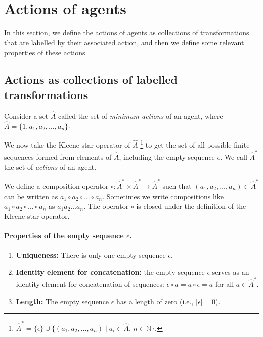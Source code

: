 \section{Actions of agents}

In this section, we define the actions of agents as collections of transformations that are labelled by their associated action, and then we define some relevant properties of these actions.

\subsection{Actions as collections of labelled transformations}

Consider a set $\hat{A}$ called the set of \emph{minimum actions} of an agent, where $\hat{A} = \{1, a_{1}, a_{2}, \dots, a_{n}\}$.

We now take the Kleene star operator of $\hat{A}$ \footnote{
	$\hat{A}^{\ast} = \{ \epsilon \} \cup \{ (a_1, a_2, \dots, a_n) \mid a_i \in \hat{A}, \, n \in \mathbb{N} \}$.
} to get the set of all possible finite sequences formed from elements of $\hat{A}$, including the empty sequence $\epsilon$.
We call $\hat{A}^{\ast}$ the set of \emph{actions} of an agent.

We define a composition operator $\circ: \hat{A}^{\ast} \times \hat{A}^{\ast} \to \hat{A}^{\ast}$ such that $(a_1, a_2, \dots, a_n) \in \hat{A}^{\ast}$ can be written as $a_1 \circ a_2 \circ \dots \circ a_n$.
Sometimes we write compositions like $a_1 \circ a_2 \circ \dots \circ a_n$ as $a_1 a_2 \dots a_n$.
The operator $\circ$ is closed under the definition of the Kleene star operator.

\paragraph{Properties of the empty sequence $\epsilon$.}
\begin{enumerate}
	\item \textbf{Uniqueness:} There is only one empty sequence $\epsilon$.
	\item \textbf{Identity element for concatenation:} the empty sequence $\epsilon$ serves as an identity element for concatenation of sequences:
	      $\epsilon \circ a = a \circ \epsilon = a$ for all $a \in \hat{A}^{\ast}$.
	\item \textbf{Length:} The empty sequence $\epsilon$ has a length of zero (i.e., $|\epsilon| = 0$).
\end{enumerate}


